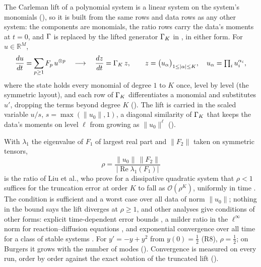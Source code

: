 The Carleman lift of a polynomial system is a linear system on the system's monomials \cite{carleman1932,kowalskisteeb1991,liu2021carleman,krovi2023improved} (), so it is built from the same rows and data rows as any other system: the components are monomials, the ratio rows carry the data's moments at $t=0$, and $\Gamma$ is replaced by the lifted generator $\Gamma_K$ in , in either form. For $u\in\mathbb{R}^M$,
\begin{equation}
    \frac{du}{dt}=\sum_{p\ge1}F_p\,u^{\otimes p}
    \quad\longrightarrow\quad
    \frac{dz}{dt}=\Gamma_K\,z,
    \qquad
    z=\bigl(u_\alpha\bigr)_{1\le|\alpha|\le K},\quad u_\alpha=\textstyle\prod_iu_i^{\alpha_i},
    \label{eq:carleman-lift}
\end{equation}
where the state holds every monomial of degree $1$ to $K$ once, level by level (the symmetric layout), and each row of $\Gamma_K$ differentiates a monomial and substitutes $u'$, dropping the terms beyond degree $K$ (). The lift is carried in the scaled variable $u/s$, $s=\max(\|u_0\|,1)$, a diagonal similarity of $\Gamma_K$ that keeps the data's moments on level $\ell$ from growing as $\|u_0\|^\ell$ ().

With $\lambda_1$ the eigenvalue of $F_1$ of largest real part and $\|F_2\|$ taken on symmetric tensors,
\begin{equation}
    \rho=\frac{\|u_0\|\,\|F_2\|}{\bigl|\operatorname{Re}\lambda_1(F_1)\bigr|}
    \label{eq:carleman-ratio}
\end{equation}
is the ratio of Liu et al., who prove for a dissipative quadratic system that $\rho<1$ suffices for the truncation error at order $K$ to fall as $\mathcal{O}(\rho^K)$, uniformly in time \cite{liu2021carleman}. The condition is sufficient and a worst case over all data of norm $\|u_0\|$; nothing in the bound says the lift diverges at $\rho\ge1$, and other analyses give conditions of other forms: explicit time-dependent error bounds \cite{forets2017carleman}, a milder ratio in the $\ell^\infty$ norm for reaction--diffusion equations \cite{liu2023reactiondiffusion}, and exponential convergence over all time for a class of stable systems \cite{amini2025carleman}. For $y'=-y+y^2$ from $y(0)=\tfrac12$ (R8), $\rho=\tfrac12$; on Burgers it grows with the number of modes (). Convergence is measured on every run, order by order against the exact solution of the truncated lift ().

